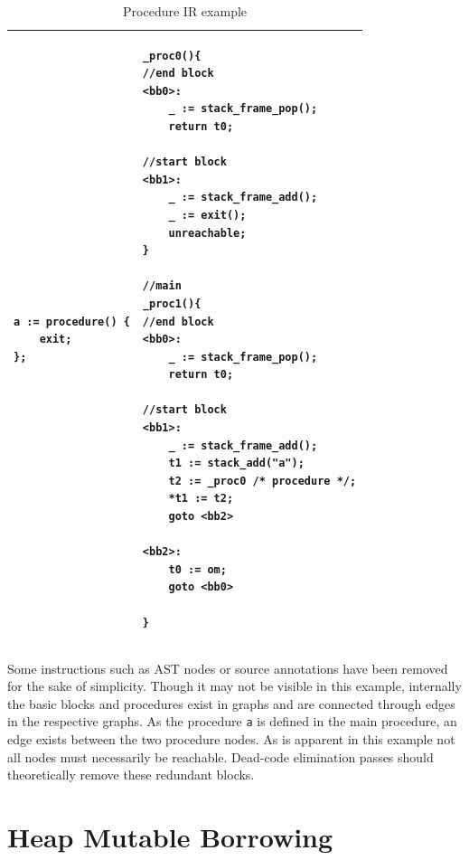 \begin{table}[h]
	\centering
    \caption{Procedure \ac{IR} example}
	\renewcommand{\arraystretch}{1}
	\begin{tabular}{ |p{7cm}|p{7cm}| }
		\hline
\begin{lstlisting}
a := procedure() {
    exit;
};
\end{lstlisting}
&
\begin{lstlisting}
_proc0(){
//end block
<bb0>:
	_ := stack_frame_pop();
	return t0;

//start block
<bb1>:
	_ := stack_frame_add();
	_ := exit();
	unreachable;
}

//main
_proc1(){
//end block
<bb0>:
	_ := stack_frame_pop();
	return t0;

//start block
<bb1>:
	_ := stack_frame_add();
	t1 := stack_add("a");
	t2 := _proc0 /* procedure */;
	*t1 := t2;
	goto <bb2>

<bb2>:
	t0 := om;
	goto <bb0>

}
\end{lstlisting}
\\
		\hline
	\end{tabular}
\end{table}

\FloatBarrier

Some instructions such as \ac{AST} nodes or source annotations have been removed for the sake of simplicity. Though it may not be visible in this example, internally the basic blocks and procedures exist in graphs and are connected through edges in the respective graphs. As the procedure \texttt{a} is defined in the main procedure, an edge exists between the two procedure nodes. As is apparent in this example not all nodes must necessarily be reachable. Dead-code elimination passes should theoretically remove these redundant blocks.

\section{Heap Mutable Borrowing}
\label{sec:heap-borrow-mut}

